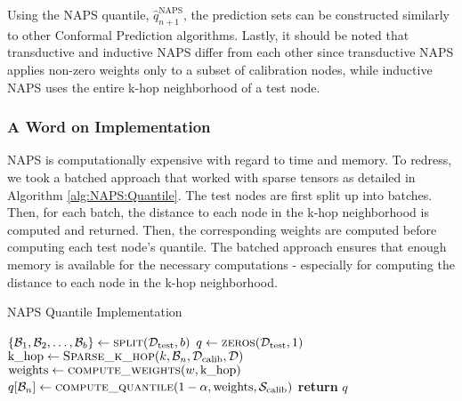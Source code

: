 Using the NAPS quantile, $\hat{q}^{\text{NAPS}}_{n+1}$, the prediction sets can be constructed similarly to other Conformal Prediction algorithms. Lastly, it should be noted that transductive and inductive NAPS differ from each other since transductive NAPS applies non-zero weights only to a subset of calibration nodes, while inductive NAPS uses the entire k-hop neighborhood of a test node.  

\subsubsection{A Word on Implementation}
NAPS is computationally expensive with regard to time and memory. To redress, we took a batched approach that worked with sparse tensors as detailed in Algorithm \ref{alg:NAPS:Quantile}. The test nodes are first split up into batches. Then, for each batch, the distance to each node in the k-hop neighborhood is computed and returned. Then, the corresponding weights are computed before computing each test node's quantile. The batched approach ensures that enough memory is available for the necessary computations - especially for computing the distance to each node in the k-hop neighborhood.  

\begin{algorithm}
\caption{NAPS Quantile Implementation}\label{alg:NAPS:Quantile}
\begin{algorithmic}[1]
    \State $\{\mathcal{B}_1,\mathcal{B}_2,\hdots,\mathcal{B}_b\}\gets \Call{\text{split}}{\test,b}$ 
    \State $q\gets \Call{\text{zeros}}{\test,1}$
        \State $\text{k\_hop} \gets \Call{\text{Sparse\_k\_hop}}{k,\mathcal{B}_n,\calib,\mathcal{D}}$
        \State $\text{weights}\gets \Call{\text{compute\_weights}}{w,\text{k\_hop}}$
        \State $q[\mathcal{B}_n]\gets \Call{\text{compute\_quantile}}{1-\alpha,\text{weights},\mathcal{S}_{\text{calib}}}$
    \EndFor\label{NAPSquantileendwhile}
    \State \textbf{return} $q$
\EndProcedure
\end{algorithmic}
\end{algorithm}

